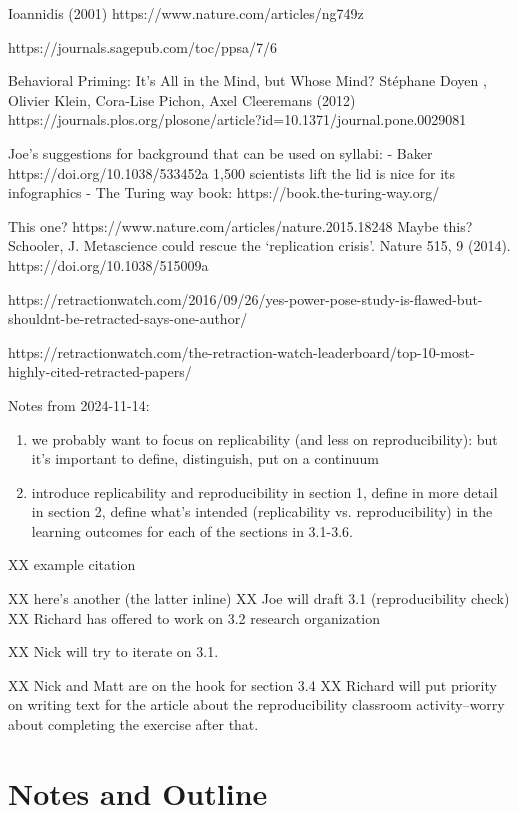\documentclass{article}
\begin{document}
Ioannidis (2001) https://www.nature.com/articles/ng749z

https://journals.sagepub.com/toc/ppsa/7/6


Behavioral Priming: It's All in the Mind, but Whose Mind?
Stéphane Doyen , Olivier Klein, Cora-Lise Pichon, Axel Cleeremans
(2012) https://journals.plos.org/plosone/article?id=10.1371/journal.pone.0029081

Joe's suggestions for background that can be used on syllabi:
- Baker https://doi.org/10.1038/533452a 1,500 scientists lift the lid is nice for its infographics
- The Turing way book: https://book.the-turing-way.org/ 

This one? https://www.nature.com/articles/nature.2015.18248
Maybe this? Schooler, J. Metascience could rescue the ‘replication crisis’. Nature 515, 9 (2014). https://doi.org/10.1038/515009a

https://retractionwatch.com/2016/09/26/yes-power-pose-study-is-flawed-but-shouldnt-be-retracted-says-one-author/

https://retractionwatch.com/the-retraction-watch-leaderboard/top-10-most-highly-cited-retracted-papers/

Notes from 2024-11-14:

\begin{enumerate}
\item we probably want to focus on replicability (and less on reproducibility): but it's important to define, distinguish, put on a continuum
\item introduce replicability and reproducibility in section 1, define in more detail in section 2, define what's intended (replicability vs. reproducibility) in the learning outcomes for each of the sections in 3.1-3.6.
\end{enumerate}

XX example citation \citep{tier}

XX here's another \cite{Sandve:2013} (the latter inline)
XX Joe will draft 3.1 (reproducibility check) 
XX Richard has offered to work on 3.2 research organization

XX Nick will try to iterate on 3.1.

XX Nick and Matt are on the hook for section 3.4
XX Richard will put priority on writing text for the article about the reproducibility classroom activity--worry about completing the exercise after that.

\section{Notes and Outline}
\end{document}
